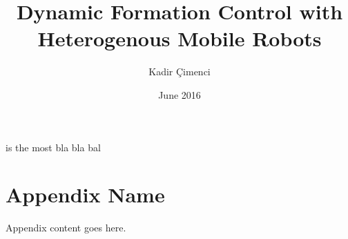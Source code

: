 \documentclass[chaparabic,ee,ms,12pt,oneandhalf]{metu}
\author{Kadir Çimenci}
\title{Dynamic Formation Control with Heterogenous Mobile Robots}
\date{June 2016}
\begin{document}
\begin{preliminaries}


\end{preliminaries}
%   
% 
%
\cite{erl05} is the most bla bla bal
\cite{kitchenham07}
\cite{atkinson04}
\cite{bpeltools}
\cite{1}
\cite{2}
\cite{3}
\cite{4}
\cite{5}
\cite{6}
\cite{7}
\cite{8}
\cite{9}
\cite{10}
\cite{11}
\cite{12}
\cite{13}
\cite{14}
\cite{15}
\cite{16}
\cite{17}
\cite{18}
\cite{19}
\cite{20}
\cite{21}
\cite{22}
\cite{23}
\cite{24}
\cite{25}
\cite{26}
\cite{27}
\cite{28}








  



	
%


\appendix
\chapter{Appendix Name}
Appendix content goes here.
 
%

\end{document}
